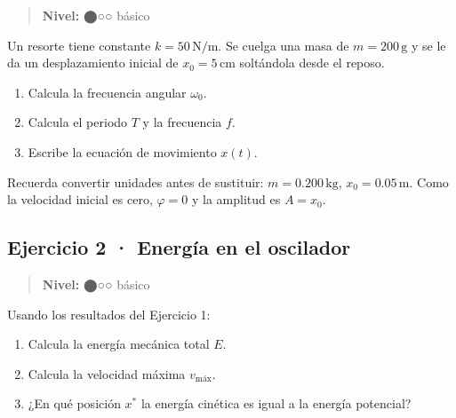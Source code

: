 \documentclass[
  letterpaper,
  DIV=11,
  numbers=noendperiod]{scrreprt}
\providecommand{\tightlist}{%
  \setlength{\itemsep}{0pt}\setlength{\parskip}{0pt}}
\begin{document}
\begin{quote}
\textbf{Nivel:} ⬤○○ básico
\end{quote}

Un resorte tiene constante \(k = 50\,\text{N/m}\). Se cuelga una masa de
\(m = 200\,\text{g}\) y se le da un desplazamiento inicial de
\(x_0 = 5\,\text{cm}\) soltándola desde el reposo.

\begin{enumerate}
\def\labelenumi{\alph{enumi})}
\tightlist
\item
  Calcula la frecuencia angular \(\omega_0\).
\item
  Calcula el periodo \(T\) y la frecuencia \(f\).
\item
  Escribe la ecuación de movimiento \(x(t)\).
\end{enumerate}

\begin{tcolorbox}[enhanced jigsaw, colbacktitle=quarto-callout-tip-color!10!white, toptitle=1mm, titlerule=0mm, rightrule=.15mm, colframe=quarto-callout-tip-color-frame, leftrule=.75mm, breakable, colback=white, bottomrule=.15mm, coltitle=black, bottomtitle=1mm, title=\textcolor{quarto-callout-tip-color}{\faLightbulb}\hspace{0.5em}{Pista}, arc=.35mm, toprule=.15mm, left=2mm, opacitybacktitle=0.6, opacityback=0]

Recuerda convertir unidades antes de sustituir:
\(m = 0.200\,\text{kg}\), \(x_0 = 0.05\,\text{m}\). Como la velocidad
inicial es cero, \(\varphi = 0\) y la amplitud es \(A = x_0\).

\end{tcolorbox}

\subsection*{Ejercicio 2 · Energía en el
oscilador}\label{ejercicio-2-energuxeda-en-el-oscilador}

\begin{quote}
\textbf{Nivel:} ⬤○○ básico
\end{quote}

Usando los resultados del Ejercicio 1:

\begin{enumerate}
\def\labelenumi{\alph{enumi})}
\tightlist
\item
  Calcula la energía mecánica total \(E\).
\item
  Calcula la velocidad máxima \(v_\text{máx}\).
\item
  ¿En qué posición \(x^*\) la energía cinética es igual a la energía
  potencial?
\end{enumerate}
\end{document}
